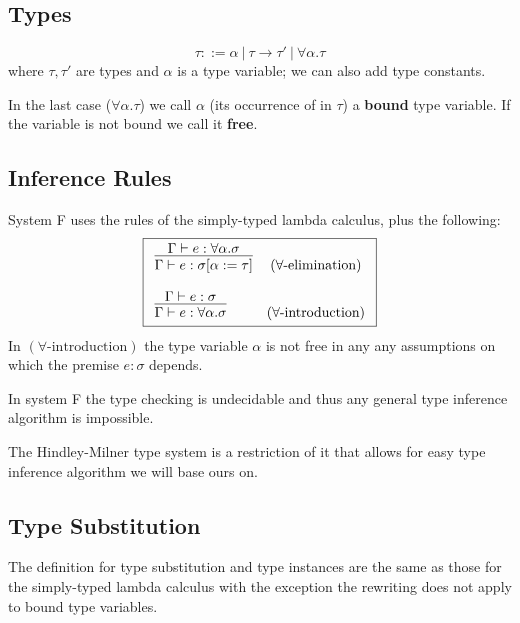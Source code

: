 \subsection{Types}

\begin{defn}[Type]
    $$\tau ::= \alpha\ |\ \tau \rightarrow \tau'\ |\ \forall \alpha . \tau$$
    where $\tau, \tau'$ are types and $\alpha$ is a type variable; we can also add type constants.
\end{defn}

In the last case ($\forall \alpha . \tau$) we call $\alpha$ (its occurrence of in $\tau$) a \textbf{bound} type variable. If the variable is not bound we call it \textbf{free}.

\subsection{Inference Rules}

\begin{defn}
    System F uses the rules of the simply-typed lambda calculus, plus the following:
    $$\boxed{\begin{array}{l c}
        \infer{\Gamma \vdash e : \sigma [\alpha := \tau]}{\Gamma \vdash e : \forall \alpha . \sigma} & (\text{$\forall$-elimination})\\\\
        \infer{\Gamma \vdash e : \forall \alpha . \sigma}{\Gamma \vdash e : \sigma} & (\text{$\forall$-introduction})
    \end{array}}$$
    In $(\text{$\forall$-introduction})$ the type variable $\alpha$ is not free in any any assumptions on which the premise $e : \sigma$ depends.
\end{defn}

In system F the type checking is undecidable and thus any general type inference algorithm is impossible.

The Hindley-Milner type system is a restriction of it that allows for easy type inference algorithm we will base ours on.

\subsection{Type Substitution}

The definition for type substitution and type instances are the same as those for the simply-typed lambda calculus with the exception the rewriting does not apply to bound type variables.

